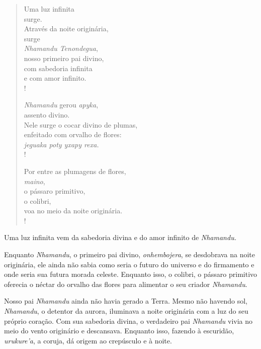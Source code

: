  

\begin{verse}
Uma luz infinita\\
surge.\\
Através da noite originária,\\
surge\\
\emph{Nhamandu Tenondegua},\\
nosso primeiro pai divino,\\
com sabedoria infinita\\
e com amor infinito.\\!
 

\emph{Nhamandu} gerou \emph{apyka},\\
assento divino.\\
Nele surge o cocar divino de plumas,\\
enfeitado com orvalho de flores:\\
\emph{jeguaka poty yxapy rexa.}\\!

Por entre as plumagens de flores,\\
\emph{maino},\\
o pássaro primitivo,\\
o colibri,\\
voa no meio da noite originária.\\!
\end{verse}

Uma luz infinita vem da sabedoria divina e do amor infinito
de \emph{Nhamandu.}

 

\asterisc{}


 

Enquanto \emph{Nhamandu}, o primeiro pai divino, \emph{onhembojera}, se
desdobrava na noite originária, ele ainda não sabia como seria o futuro
do universo e do firmamento e onde seria sua futura morada celeste.
Enquanto isso, o colibri, o pássaro primitivo oferecia o néctar do
orvalho das flores para alimentar o seu criador \emph{Nhamandu}.

Nosso pai \emph{Nhamandu} ainda não havia gerado a Terra. Mesmo não
havendo sol, \emph{Nhamandu}, o detentor da aurora, iluminava a noite
originária com a luz do seu próprio coração. Com sua sabedoria divina, o
verdadeiro pai \emph{Nhamandu} vivia no meio do vento originário e
descansava. Enquanto isso, fazendo à escuridão, \emph{urukure'a}, a
coruja, dá origem ao crepúsculo e à noite.

